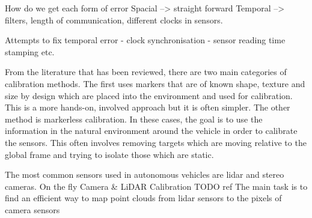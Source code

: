 How do we get each form of error
Spacial --> straight forward
Temporal --> filters, length of communication, different clocks in sensors.


Attempts to fix temporal error
- clock synchronisation
- sensor reading time stamping 
etc. 


From the literature that has been reviewed, there are two main categories of calibration methods. The first uses markers that are of known shape, texture and size by design which are placed into the environment and used for calibration. This is a more hands-on, involved approach but it is often simpler. 
The other method is markerless calibration. In these cases, the goal is to use the information in the natural environment around the vehicle in order to calibrate the sensors. This often involves removing targets which are moving relative to the global frame and trying to isolate those which are static. 

The most common sensors used in autonomous vehicles are lidar and stereo cameras. 
On the fly Camera \& LiDAR Calibration
TODO ref
The main task is to find an efficient way to map point clouds from lidar sensors to the pixels of camera sensors




